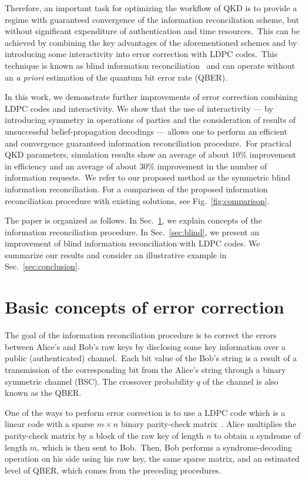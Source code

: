 \documentclass[aps,pra,twocolumn,amsmath,amssymb,nofootinbib,showpacs,superscriptaddress]{revtex4-1}
\begin{document}
Therefore, an important task for optimizing the workflow of QKD is to provide a regime with guaranteed convergence of the information reconciliation scheme, but without significant expenditure of authentication and time resources.~This can be achieved by combining the key advantages of the aforementioned schemes and by introducing some interactivity into error correction with LDPC codes.~This technique is known as blind information reconciliation~\cite{LDPC4_adapt1,LDPC5_blind,LDPC6_blindrep} and can operate without an \emph{a priori} estimation of the quantum bit error rate (QBER).

In this work, we demonstrate further improvements of error correction combining LDPC codes and interactivity. 
We show that the use of interactivity --- by introducing symmetry in operations of parties and the consideration of results of unsuccessful belief-propagation decodings --- 
allows one to perform an efficient and convergence guaranteed information reconciliation procedure.~For practical QKD parameters, simulation results show an average of about 
${10}\%$ improvement in efficiency and an average of about ${30}\%$ improvement in the number of information requests.~We refer to our proposed method as the symmetric blind information reconciliation.
For a comparison of the proposed information reconciliation procedure with existing solutions, see Fig.~\ref{fig:comparison}.

The paper is organized as follows. 
In Sec.~\ref{sec:basic}, we explain concepts of the information reconciliation procedure.
In Sec.~\ref{sec:blind}, we present an improvement of blind information reconciliation with LDPC codes.
We summarize our results and consider an illustrative example in Sec.~\ref{sec:conclusion}. 

\section{Basic concepts of error correction}\label{sec:basic}

The goal of the information reconciliation procedure is to correct the errors between Alice's and Bob's raw keys 
by disclosing some key information over a public (authenticated) channel.~Each bit value of the Bob's string is a result of a transmission of the corresponding bit from the Alice's string through a binary symmetric channel (BSC).
The crossover probability $q$ of the channel is also known as the QBER.

One of the ways to perform error correction is to use a LDPC code which is a linear code with a sparse $m\times n$ binary parity-check matrix~\cite{LDPC_orig1,LDPC_orig2}.
Alice multiplies the parity-check matrix by a block of the raw key of length $n$ to obtain a syndrome of length $m$, which is then sent to Bob.~Then, Bob performs a syndrome-decoding operation on his side using his raw key, 
the same sparse matrix, and an estimated level of QBER, which comes from the preceding procedures.
\end{document}
